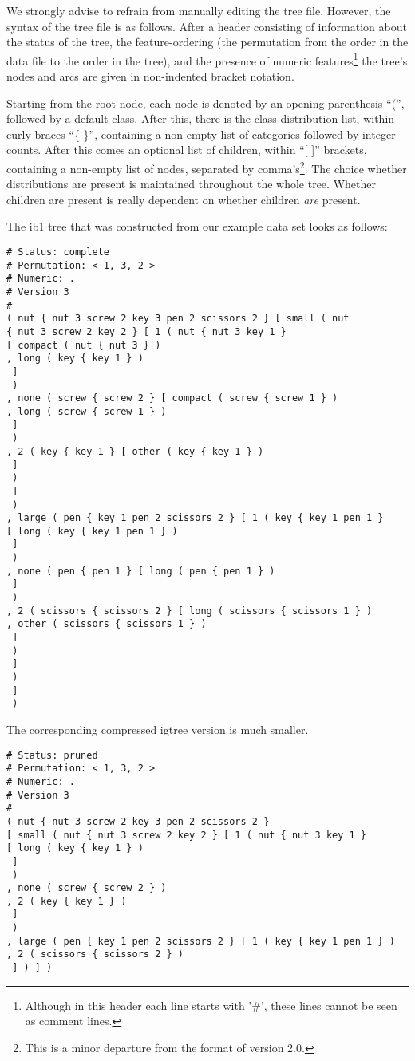 \documentclass{report}
\begin{document}
We strongly advise to refrain from manually editing the tree
file. However, the syntax of the tree file is as follows. After a
header consisting of information about the status of the tree, the
feature-ordering (the permutation from the order in the data file to
the order in the tree), and the presence of numeric
features\footnote{Although in this header each line starts with '\#',
these lines cannot be seen as comment lines.} the tree's nodes and
arcs are given in non-indented bracket notation.

Starting from the root node, each node is denoted by an opening
parenthesis ``('', followed by a default class. After this, there is
the class distribution list, within curly braces ``\{ \}'', containing
a non-empty list of categories followed by integer counts. After this
comes an optional list of children, within ``[ ]'' brackets,
containing a non-empty list of nodes, separated by
comma's\footnote{This is a minor departure from the format of version
2.0.}. The choice whether distributions are present is maintained
throughout the whole tree. Whether children are present is really
dependent on whether children {\em are} present.

The {\sc ib1} tree that was constructed from our example data set looks as
follows:

\begin{verbatim}
# Status: complete
# Permutation: < 1, 3, 2 >
# Numeric: .
# Version 3
#
( nut { nut 3 screw 2 key 3 pen 2 scissors 2 } [ small ( nut 
{ nut 3 screw 2 key 2 } [ 1 ( nut { nut 3 key 1 } 
[ compact ( nut { nut 3 } )
, long ( key { key 1 } )
 ]
 )
, none ( screw { screw 2 } [ compact ( screw { screw 1 } )
, long ( screw { screw 1 } )
 ]
 )
, 2 ( key { key 1 } [ other ( key { key 1 } )
 ]
 )
 ]
 )
, large ( pen { key 1 pen 2 scissors 2 } [ 1 ( key { key 1 pen 1 } 
[ long ( key { key 1 pen 1 } )
 ]
 )
, none ( pen { pen 1 } [ long ( pen { pen 1 } )
 ]
 )
, 2 ( scissors { scissors 2 } [ long ( scissors { scissors 1 } )
, other ( scissors { scissors 1 } )
 ]
 )
 ]
 )
 ]
 )

\end{verbatim}

The corresponding compressed {\sc igtree} version is much smaller. 

\begin{verbatim}
# Status: pruned
# Permutation: < 1, 3, 2 >
# Numeric: .
# Version 3
#
( nut { nut 3 screw 2 key 3 pen 2 scissors 2 } 
[ small ( nut { nut 3 screw 2 key 2 } [ 1 ( nut { nut 3 key 1 } 
[ long ( key { key 1 } )
 ]
 )
, none ( screw { screw 2 } )
, 2 ( key { key 1 } )
 ]
 )
, large ( pen { key 1 pen 2 scissors 2 } [ 1 ( key { key 1 pen 1 } )
, 2 ( scissors { scissors 2 } )
 ] ) ] )

\end{verbatim}
\end{document}

